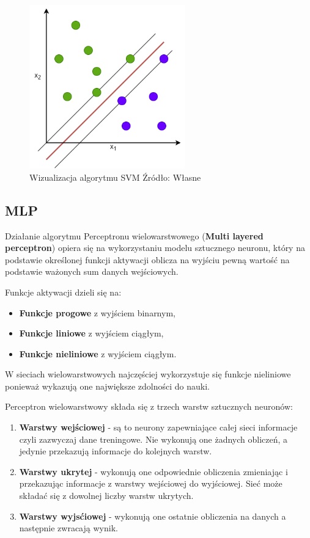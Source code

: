 \begin{figure}[h]
    \centering
    \includegraphics[width=0.6\textwidth]{./Img/SVM.png}
    \caption{Wizualizacja algorytmu SVM Źródło: Własne}
\end{figure}

\subsection{MLP}

Działanie algorytmu Perceptronu wielowarstwowego (\textbf{Multi layered perceptron}) 
opiera się na wykorzystaniu modelu sztucznego neuronu, który na podstawie określonej
funkcji aktywacji oblicza na wyjściu pewną wartość na podstawie ważonych sum danych
wejściowych. 

Funkcje aktywacji dzieli się na:
\begin{itemize}
    \item \textbf{Funkcje progowe} z wyjściem binarnym,
    \item \textbf{Funkcje liniowe} z wyjściem ciągłym,
    \item \textbf{Funkcje nieliniowe} z wyjściem ciągłym.
\end{itemize}
W sieciach wielowarstwowych najczęściej wykorzystuje się funkcje nieliniowe ponieważ 
wykazują one największe zdolności do nauki.

Perceptron wielowarstwowy składa się z trzech warstw sztucznych neuronów: 
\begin{enumerate}
    \item \textbf{Warstwy wejściowej} - są to neurony zapewniające całej sieci
    informacje czyli zazwyczaj dane treningowe. Nie wykonują one żadnych obliczeń,
    a jedynie przekazują informacje do kolejnych warstw.
    \item \textbf{Warstwy ukrytej} - wykonują one odpowiednie obliczenia zmieniając 
    i przekazując informacje z warstwy wejściowej do wyjściowej. Sieć może składać
    się z dowolnej liczby warstw ukrytych.
    \item \textbf{Warstwy wyjsćiowej} - wykonują one ostatnie obliczenia na danych 
    a następnie zwracają wynik.
\end{enumerate}

